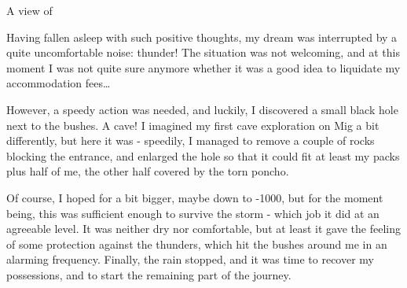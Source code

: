 \begin{marginfigure}
\checkoddpage \ifoddpage \forcerectofloat \else \forceversofloat \fi
\centering
 \caption{A view of \protect{} }
 \label{bohinj gergely}
\end{marginfigure}


Having fallen asleep with such positive thoughts, my dream was
interrupted by a quite uncomfortable noise: thunder! The situation was
not welcoming, and at this moment I was not quite sure anymore whether
it was a good idea to liquidate my accommodation fees\ldots{}

However, a speedy action was needed, and luckily, I discovered a small
black hole next to the bushes. A cave! I imagined my first cave
exploration on Mig a bit differently, but here it was - speedily, I
managed to remove a couple of rocks blocking the entrance, and enlarged
the hole so that it could fit at least my packs plus half of me, the
other half covered by the torn poncho.

Of course, I hoped for a bit bigger, maybe down to -1000, but for the
moment being, this was sufficient enough to survive the storm - which
job it did at an agreeable level. It was neither dry nor comfortable,
but at least it gave the feeling of some protection against the
thunders, which hit the bushes around me in an alarming frequency.
Finally, the rain stopped, and it was time to recover my possessions,
and to start the remaining part of the journey.



